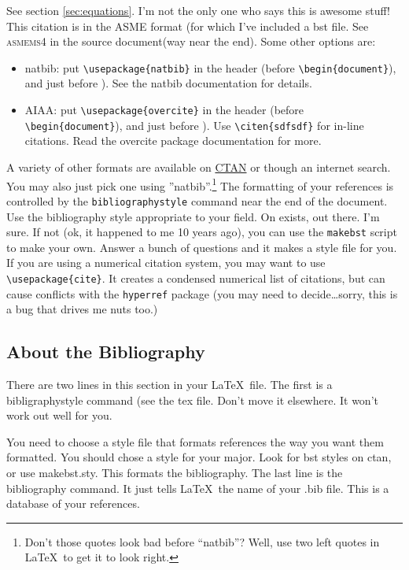 \documentclass[12pt]{report}
\begin{document}
See section \ref{sec:equations}. I'm not the only one who says this is awesome stuff\cite{Mortara2004}!
This citation is in the ASME format (for which I've included a bst file. See \textsc{asmems4} in the source document(way near the end). Some  other options are:
\begin{itemize}
\item natbib:  put \verb'\usepackage{natbib}' in the header (before \verb'\begin{document}'), and \verb'' just before \verb'').  See the natbib documentation for details.
\item AIAA:  put \verb'\usepackage{overcite}' in the header (before \verb'\begin{document}'), and \verb'' just before \verb''). Use \verb'\citen{sdfsdf}' for in-line citations. Read the overcite package documentation for more. 
\end{itemize}

A variety of other formats are available on \href{http://www.ctan.org}{CTAN} or though an internet search. You may also just pick one using ''natbib''.\footnote{Don't those quotes look bad before ``natbib''? Well, use two left quotes in \LaTeX\ to get it to look right.}  The formatting of your references is controlled by the \verb'bibliographystyle' command near the end of the document. Use the bibliography style appropriate to your field. On exists, out there. I'm sure. If not (ok, it happened to me 10 years ago), you can use the \verb'makebst' script to make your own. Answer a bunch of questions and it makes a style file for you. If you are using a numerical citation system, you may want to use \verb'\usepackage{cite}'. It creates a condensed numerical list of citations, but can cause conflicts with the \verb'hyperref' package (you may need to decide\ldots sorry, this is a bug that drives me nuts too.)

\subsection{About the Bibliography}
There are two lines in this section in your \LaTeX\ file. The first is a bibligraphystyle command (see the \textsf{tex} file. Don't move it elsewhere. It won't work out well for you.

You need to choose a style file that formats references the way you want them formatted.  You should chose a style for your major.  Look for bst styles on ctan, or use makebst.sty. This formats the bibliography.
The last line is the bibliography command. It just tells \LaTeX\  the name of your \textsf{.bib} file. This is a database of your references. 
\end{document}
